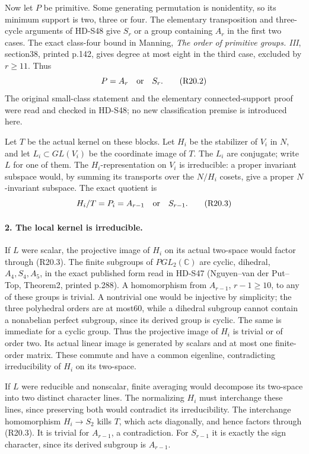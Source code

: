 Now let \(P\) be primitive. Some generating permutation
is nonidentity, so its minimum support is two, three
or four. The elementary transposition and three-cycle
arguments of HD-S48 give \(S_r\) or a group containing
\(A_r\) in the first two cases. The exact class-four
bound in Manning, \emph{The order of primitive groups. III},
section38, printed p.142, gives degree at most eight
in the third case, excluded by \(r\ge11\).
Thus
\[
                         P=A_r\quad\hbox{or}\quad S_r.
                                                               \tag{R20.2}
\]
The original small-class statement and the elementary
connected-support proof were read and checked in HD-S48;
no new classification premise is introduced here.

Let \(T\) be the actual kernel on these blocks.
Let \(H_i\) be the stabilizer of \(V_i\) in \(N\),
and let \(L_i\subset GL(V_i)\) be the coordinate
image of \(T\). The \(L_i\) are conjugate; write
\(L\) for one of them. The \(H_i\)-representation
on \(V_i\) is irreducible: a proper invariant subspace
would, by summing its transports over the \(N/H_i\)
cosets, give a proper \(N\)-invariant subspace.
The exact quotient is
\[
                H_i/T=P_i=A_{r-1}\quad\hbox{or}\quad S_{r-1}.
                                                               \tag{R20.3}
\]

\paragraph{2. The local kernel is irreducible.}
If \(L\) were scalar, the projective image of \(H_i\)
on its actual two-space would factor through (R20.3).
The finite subgroups of \(PGL_2(\mathbb C)\) are
cyclic, dihedral, \(A_4,S_4,A_5\), in the exact
published form read in HD-S47 (Nguyen--van der Put--Top,
Theorem2, printed p.288). A homomorphism from
\(A_{r-1}\), \(r-1\ge10\), to any of these groups
is trivial. A nontrivial one would be injective by
simplicity; the three polyhedral orders are at most60,
while a dihedral subgroup cannot contain a nonabelian
perfect subgroup, since its derived group is cyclic.
The same is immediate for a cyclic group.
Thus the projective image of \(H_i\) is trivial or
of order two. Its actual linear image is generated
by scalars and at most one finite-order matrix.
These commute and have a common eigenline, contradicting
irreducibility of \(H_i\) on its two-space.

If \(L\) were reducible and nonscalar, finite averaging
would decompose its two-space into two distinct character
lines. The normalizing \(H_i\) must interchange these
lines, since preserving both would contradict its
irreducibility. The interchange homomorphism
\(H_i\to S_2\) kills \(T\), which acts diagonally,
and hence factors through (R20.3). It is trivial for
\(A_{r-1}\), a contradiction. For \(S_{r-1}\)
it is exactly the sign character, since its derived
subgroup is \(A_{r-1}\).

